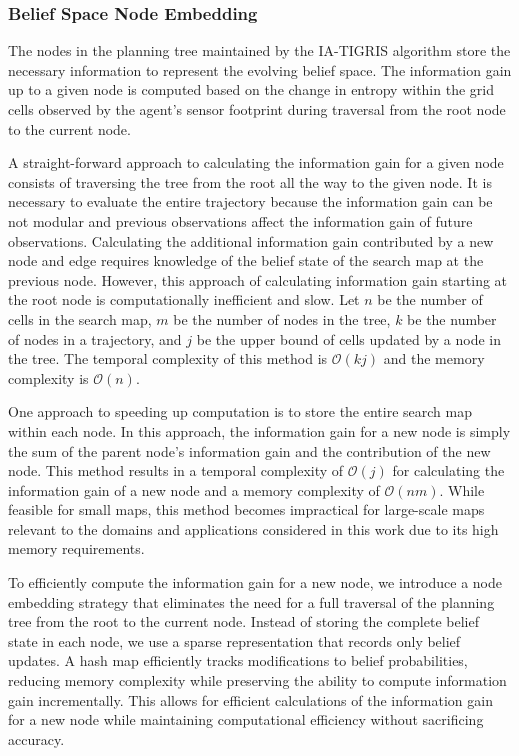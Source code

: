 
\subsubsection{Belief Space Node Embedding}\label{sec:embedding}

The nodes in the planning tree maintained by the IA-TIGRIS algorithm store the necessary information to represent the evolving belief space. 
The information gain up to a given node is computed based on the change in entropy within the grid cells observed by the agent’s sensor footprint during traversal from the root node to the current node.

A straight-forward approach to calculating the information gain for a given node consists of traversing the tree from the root all the way to the given node. It is necessary to evaluate the entire trajectory because the information gain can be not modular and previous observations affect the information gain of future observations. 
Calculating the additional information gain contributed by a new node and edge requires knowledge of the belief state of the search map at the previous node. However, this approach of calculating information gain starting at the root node is computationally inefficient and slow.
Let $n$ be the number of cells in the search map, $m$ be the number of nodes in the tree, $k$ be the number of nodes in a trajectory, and $j$ be the upper bound of cells updated by a node in the tree. The temporal complexity of this method is $\mathcal{O}(kj)$ and the memory complexity is $\mathcal{O}(n)$.

One approach to speeding up computation is to store the entire search map within each node. In this approach, the information gain for a new node is simply the sum of the parent node’s information gain and the contribution of the new node. This method results in a temporal complexity of $\mathcal{O}(j)$ for calculating the information gain of a new node and a memory complexity of $\mathcal{O}(nm)$. While feasible for small maps, this method becomes impractical for large-scale maps relevant to the domains and applications considered in this work due to its high memory requirements.

To efficiently compute the information gain for a new node, we introduce a node embedding strategy that eliminates the need for a full traversal of the planning tree from the root to the current node. Instead of storing the complete belief state in each node, we use a sparse representation that records only belief updates. A hash map efficiently tracks modifications to belief probabilities, reducing memory complexity while preserving the ability to compute information gain incrementally. This allows for efficient calculations of the information gain for a new node while maintaining computational efficiency without sacrificing accuracy.

